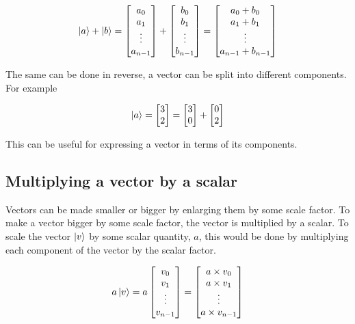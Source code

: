 \documentclass{book}
\begin{document}
$$\ket{a} + \ket{b} = \begin{bmatrix} a_0 \\ a_1 \\ \vdots \\ a_{n-1} \end{bmatrix} + \begin{bmatrix} b_0 \\ b_1 \\ \vdots \\ b_{n-1} \end{bmatrix} = \begin{bmatrix} a_0 + b_0 \\ a_1 + b_1 \\ \vdots \\ a_{n-1} + b_{n-1} \end{bmatrix} 
$$

The same can be done in reverse, a vector can be split into different components. For example 

$$
\ket{a} = \begin{bmatrix} 3 \\ 2 \end{bmatrix} = \begin{bmatrix} 3 \\ 0 \end{bmatrix} + \begin{bmatrix} 0 \\ 2 \end{bmatrix}
$$

This can be useful for expressing a vector in terms of its components. 

\subsection{ Multiplying a vector by a scalar }

Vectors can be made smaller or bigger by enlarging them by some scale factor. To make a vector bigger by some scale factor, the vector is multiplied by a scalar. To scale the vector $\ket{v}$ by some scalar quantity, $a$, this would be done by multiplying each component of the vector by the scalar factor. 

$$
a \ket{v} = a\begin{bmatrix} v_0 \\ v_1 \\ \vdots \\ v_{n-1} \end{bmatrix} = \begin{bmatrix} a \times v_0 \\ a \times v_1 \\ \vdots \\ a \times v_{n-1} \end{bmatrix} 
$$
\end{document}
